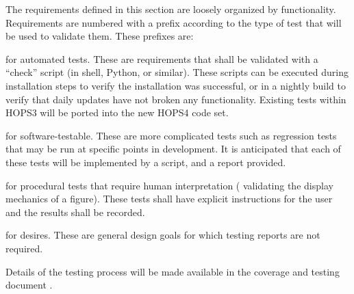 The requirements defined in this section are loosely organized by functionality.
Requirements are numbered with a prefix according to
the type of test that will be used to validate them.  These prefixes are:
\begin{description}
[align=left, labelwidth=0.0cm, leftmargin=1cm]
\item[A,] for automated tests. These are requirements
that shall be validated with a ``check'' script (in shell, Python, or similar).
These scripts can be executed during installation steps to verify the
installation was successful,
or in a nightly build to verify that daily updates have not broken any
functionality. Existing tests within HOPS3 will be ported into the new
HOPS4 code set.

\item[S,] for software-testable. These are more complicated tests such as
regression tests that may be run at specific points in development. It is
anticipated that each of these tests will be implemented by a script, and a report provided.

\item[P,] for procedural tests that require human interpretation (\eg
validating the display mechanics of a figure). These tests shall have
explicit instructions for the user and the results shall be recorded.

\item[D,] for desires. These are general design goals for which testing reports are not required.


\end{description}

Details of the testing process will be made available in the coverage
and testing document \cite{cover}.






